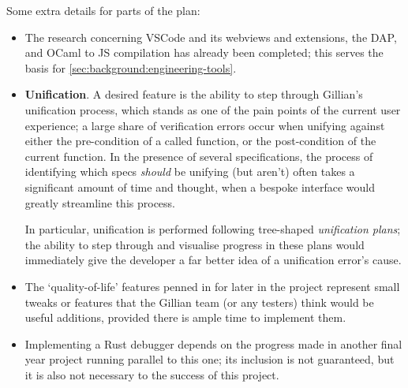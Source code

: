 Some extra details for parts of the plan:

\begin{itemize}
  \item The research concerning VSCode and its webviews and extensions, the
        DAP, and OCaml to JS compilation has already been completed; this
        serves the basis for \autoref{sec:background:engineering-tools}.

  \item \textbf{Unification}. A desired feature is the ability to step through
        Gillian's unification process, which stands as one of the pain points
        of the current user experience; a large share of verification errors
        occur when unifying against either the pre-condition of a called
        function, or the post-condition of the current function. In the
        presence of several specifications, the process of identifying which
        specs \textit{should} be unifying (but aren't) often takes a
        significant amount of time and thought, when a bespoke interface would
        greatly streamline this process.

        In particular, unification is performed following tree-shaped
        \textit{unification plans}; the ability to step through and visualise
        progress in these plans would immediately give the developer a far
        better idea of a unification error's cause.

  \item The `quality-of-life' features penned in for later in the project
        represent small tweaks or features that the Gillian team (or any
        testers) think would be useful additions, provided there is ample time
        to implement them.

  \item Implementing a Rust debugger depends on the progress made in another
        final year project running parallel to this one; its inclusion is not
        guaranteed, but it is also not necessary to the success of this project.

\end{itemize}
